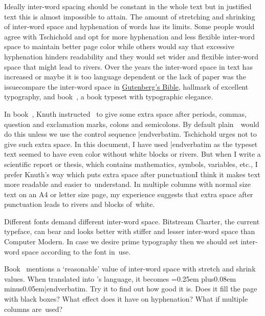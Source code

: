 {

Ideally inter-word spacing should be constant in the whole text but in justified text this is almost impossible to attain. The amount of stretching and shrinking of inter-word space and hyphenation of words has its limits. Some people would agree with Tschichold and opt for more hyphenation and less flexible inter-word space to maintain better page color while others would say that excessive hyphenation hinders readability and they would set wider and flexible inter-word space that might lead to rivers. Over the years the inter-word space in text has increased or maybe it is too language dependent or the lack of paper was the issue\emdash compare the inter-word space in \href{http://burton.byu.edu/Bible\%20Site/Gutenberg.htm}{Gutenberg's Bible}, hallmark of excellent typography, and book~\cite{knuth_texbook}, a book typeset with typo\-gra\-phic elegance.

In book~\cite{knuth_texbook}, Knuth instructed \capstex\ to give some extra space after periods, commas, question and exclamation marks, colons and semicolons. By default plain~\capstex\ would do this unless we use the control sequence {\color{brown}\verbatim \frenchspacing|endverbatim}. Tschichold urges not to give such extra space. In this document, I have used {\color{brown}\verbatim \frenchspacing|endverbatim} as the typeset text seemed to have even color without white blocks or rivers. But when I write a scientific report or thesis, which contains mathematics, symbols, variables, etc., I prefer Knuth's way which puts extra space after punctuation\emdash I think it makes text more readable and easier to~understand. In multiple columns with normal size text on an A4 or letter size page, my experience suggests that extra space after punctuation leads to rivers and blocks of~white.

Different fonts demand different inter-word space. Bitstream Charter, the current typeface, can bear and looks better with stiffer and lesser inter-word space than Computer Modern. In case we desire prime typography then we should set inter-word space according to the font in~use.

Book~\cite{elements_typographic} mentions a `reasonable' value of inter-word space with stretch and shrink values. When translated into \capstex's language, it becomes {\color{brown}\verbatim \spaceskip=0.25em plus0.08em minus0.05em|endverbatim}. Try it to find out how good it is. Does it fill the page with black boxes? What effect does it have on hyphenation? What if multiple columns are~used?

}
